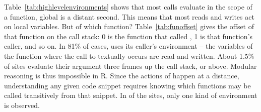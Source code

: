 \documentclass[screen,acmsmall]{acmart}%
\begin{document}
Table~\ref{tab:highlevelenvironments} shows that most calls evaluate in the
scope of a function, global is a distant second. This means that most reads and
writes act on local variables. But of which function? Table~\ref{tab:funoffset}
gives the offset of that function on the call stack: 0 is the function that called
\eval, 1 is that function's caller, and so on. In 81\% of cases, \eval uses
its caller's environment -- the variables of the function where the call to \eval
textually occurs are read and written. About 1.5\% of sites evaluate their
argument three frames up the call stack, or above. Modular reasoning is thus
impossible in R. Since the actions of \eval happen at a distance, understanding
any given code snippet requires knowing which functions may be called
transitively from that snippet. In \packageNbOneCategoryEnvirSitePercent of
the sites, only one kind of environment is observed.
\end{document}

